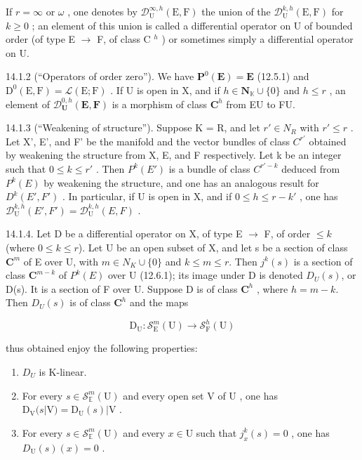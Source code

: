 If \(r=\infty\) or \(\omega\) , one denotes by \(\mathcal{D}_{\mathrm{U}}^{\infty,h}(\mathrm{E},\mathrm{F})\) the union of the \(\mathcal{D}_{\mathrm{U}}^{k,h}(\mathrm{E},\mathrm{F})\) for \(k\geqslant0\) ; an element of this union is called a differential operator on U of bounded order (of type E \(\rightarrow\) F, of class C \(^{h}\) ) or sometimes simply a differential operator on U.

14.1.2 (“Operators of order zero”). We have \(\mathbf{P}^0 (\mathbf{E}) = \mathbf{E}\) (12.5.1) and \(\mathrm{D}^0 (\mathrm{E},\mathrm{F}) = \mathcal{L}(\mathrm{E};\mathrm{F})\) . If U is open in X, and if \(h\in \mathbf{N}_{\mathbb{K}}\cup \{0\}\) and \(h\leqslant r\) , an element of \(\mathcal{D}_{\mathbf{U}}^{0,h}(\mathbf{E},\mathbf{F})\) is a morphism of class \(\mathbf{C}^h\) from E\textbar U to F\textbar U.

14.1.3 (“Weakening of structure”). Suppose K = R, and let \(r' \in N_{R}\) with \(r' \leqslant r\) . Let X', E', and F' be the manifold and the vector bundles of class \(C^{r'}\) obtained by weakening the structure from X, E, and F respectively. Let k be an integer such that \(0 \leqslant k \leqslant r'\) . Then \(P^{k}(E')\) is a bundle of class \(C^{r'-k}\) deduced from \(P^{k}(E)\) by weakening the structure, and one has an analogous result for \(D^{k}(E', F')\) . In particular, if U is open in X, and if \(0 \leqslant h \leqslant r - k'\) , one has \(\mathcal{D}_{\mathrm{U}}^{k,h}(E', F') = \mathcal{D}_{\mathrm{U}}^{k,h}(E, F)\) .

14.1.4. Let D be a differential operator on X, of type E \(\to\) F, of order \(\leqslant k\) (where \(0 \leqslant k \leqslant r\)). Let U be an open subset of X, and let s be a section of class \(\mathbf{C}^{m}\) of E over U, with \(m \in N _{K} \cup \{0\}\) and \(k \leqslant m \leqslant r\). Then \(j^{k}(s)\) is a section of class \(\mathbf{C}^{m-k}\) of \(P^{k}(E)\) over U (12.6.1); its image under D is denoted \(D_{U}(s)\), or D(s). It is a section of F over U. Suppose D is of class \(\mathbf{C}^{h}\) , where \(h=m-k\). Then \(D_{U}(s)\) is of class \(\mathbf{C}^{h}\) and the maps

\[
\mathrm{D} _ {\mathrm{U}} \colon \mathcal {S} _ {\mathrm{E}} ^ {m} (\mathrm{U}) \rightarrow \mathcal {S} _ {\mathrm{F}} ^ {h} (\mathrm{U})
\]

thus obtained enjoy the following properties:

\begin{enumerate}
\def\labelenumi{(\arabic{enumi})}
\item
  \(D_{U}\) is K-linear.
\item
  For every \(s \in \mathcal{S}_{\mathbb{E}}^{m}(\mathrm{U})\) and every open set \(\mathrm{V}\) of \(\mathrm{U}\) , one has \(\mathrm{D}_{\mathrm{V}}(s|\mathrm{V}) = \mathrm{D}_{\mathrm{U}}(s)|\mathrm{V}\) .
\item
  For every \(s \in \mathcal{S}_{\mathbb{E}}^{m}(\mathrm{U})\) and every \(x \in \mathrm{U}\) such that \(j_{x}^{k}(s) = 0\) , one has \(D_{\mathrm{U}}(s)(x) = 0\) .
\end{enumerate}

